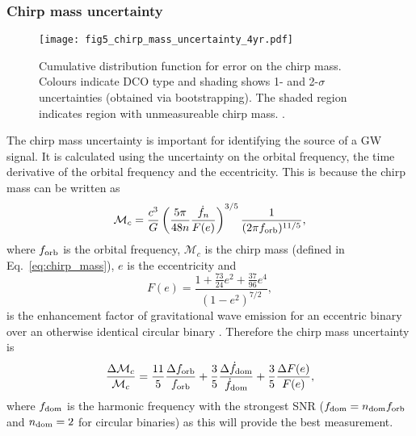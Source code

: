 \subsubsection{Chirp mass uncertainty}

\begin{figure}[tb]
    \centering
    \texttt{[image: fig5\_chirp\_mass\_uncertainty\_4yr.pdf]}
    \caption{Cumulative distribution function for error on the chirp mass. Colours indicate DCO type and shading shows 1- and 2-$\sigma$ uncertainties (obtained via bootstrapping). The shaded region indicates region with unmeasureable chirp mass. \href{https://github.com/TomWagg/detecting-DCOs-in-LISA/blob/main/paper/figures/fig5_chirp_mass_uncertainty_4yr.pdf}{\faFileImage} \href{https://github.com/TomWagg/detecting-DCOs-in-LISA/blob/main/paper/figure_notebooks/fiducial.ipynb}{\faBook}.}
    \label{fig:m_c_unc}
\end{figure}

The chirp mass uncertainty is important for identifying the source of a GW signal. It is calculated using the uncertainty on the orbital frequency, the time derivative of the orbital frequency and the eccentricity. This is because the chirp mass can be written as
\begin{equation}
    \mathcal{M}_c = \frac{c^3}{G} \left( \frac{5 \pi}{48 n} \frac{\dot{f}_{n}}{F(e)} \right)^{3/5} \frac{1}{(2 \pi f_{\rm orb})^{11/5}},
\end{equation}
where $f_{\rm orb}$ is the orbital frequency, $\mathcal{M}_{c}$ is the chirp mass (defined in Eq.~\ref{eq:chirp_mass}), $e$ is the eccentricity and
\begin{equation}
    F(e) = \frac{1 + \frac{73}{24} e^2 + \frac{37}{96} e^4}{(1 - e^2)^{7/2}},
\end{equation}
is the enhancement factor of gravitational wave emission for an eccentric binary over an otherwise identical circular binary \citep[][Eq.~17]{Peters+1963}. Therefore the chirp mass uncertainty is
\begin{equation}\label{eq:chirp_mass_uncertainty}
    \frac{\Delta \mathcal{M}_c}{\mathcal{M}_c} = \frac{11}{5} \frac{\Delta f_{\rm orb}}{f_{\rm orb}} + \frac{3}{5} \frac{\Delta \dot{f}_{\rm dom}}{\dot{f}_{\rm dom}} + \frac{3}{5} \frac{\Delta F(e)}{F(e)},
\end{equation}
where $f_{\rm dom}$ is the harmonic frequency with the strongest SNR ($f_{\rm dom} = n_{\rm dom} f_{\rm orb}$ and $n_{\rm dom} = 2$ for circular binaries) as this will provide the best measurement.

